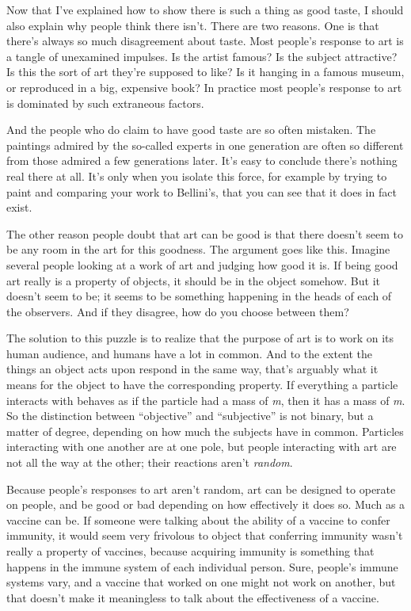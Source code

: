 Now that I've explained how to show there is such a thing as good taste,
I should also explain why people think there isn't. There are two
reasons. One is that there's always so much disagreement about taste.
Most people's response to art is a tangle of unexamined impulses. Is the
artist famous? Is the subject attractive? Is this the sort of art
they're supposed to like? Is it hanging in a famous museum, or
reproduced in a big, expensive book? In practice most people's response
to art is dominated by such extraneous factors.

And the people who do claim to have good taste are so often mistaken.
The paintings admired by the so-called experts in one generation are
often so different from those admired a few generations later. It's easy
to conclude there's nothing real there at all. It's only when you
isolate this force, for example by trying to paint and comparing your
work to Bellini's, that you can see that it does in fact exist.

The other reason people doubt that art can be good is that there doesn't
seem to be any room in the art for this goodness. The argument goes like
this. Imagine several people looking at a work of art and judging how
good it is. If being good art really is a property of objects, it should
be in the object somehow. But it doesn't seem to be; it seems to be
something happening in the heads of each of the observers. And if they
disagree, how do you choose between them?

The solution to this puzzle is to realize that the purpose of art is to
work on its human audience, and humans have a lot in common. And to the
extent the things an object acts upon respond in the same way, that's
arguably what it means for the object to have the corresponding
property. If everything a particle interacts with behaves as if the
particle had a mass of \emph{m}, then it has a mass of \emph{m}. So the
distinction between ``objective'' and ``subjective'' is not binary, but
a matter of degree, depending on how much the subjects have in common.
Particles interacting with one another are at one pole, but people
interacting with art are not all the way at the other; their reactions
aren't \emph{random}.

Because people's responses to art aren't random, art can be designed to
operate on people, and be good or bad depending on how effectively it
does so. Much as a vaccine can be. If someone were talking about the
ability of a vaccine to confer immunity, it would seem very frivolous to
object that conferring immunity wasn't really a property of vaccines,
because acquiring immunity is something that happens in the immune
system of each individual person. Sure, people's immune systems vary,
and a vaccine that worked on one might not work on another, but that
doesn't make it meaningless to talk about the effectiveness of a
vaccine.

